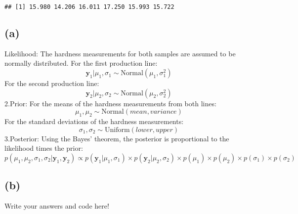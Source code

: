 \documentclass[
]{article}
\begin{document}
\begin{verbatim}
## [1] 15.980 14.206 16.011 17.250 15.993 15.722
\end{verbatim}

\hypertarget{a-2}{%
\subsection{(a)}\label{a-2}}

Likelihood: The hardness measurements for both samples are assumed to be
normally distributed. For the first production line: \[
\mathbf{y}_1 | \mu_1, \sigma_1 \sim \text{Normal}(\mu_1, \sigma_1^2)
\] For the second production line: \[
\mathbf{y}_2 | \mu_2, \sigma_2 \sim \text{Normal}(\mu_2, \sigma_2^2)
\] 2.Prior: For the means of the hardness measurements from both lines:
\[
\mu_1, \mu_2 \sim \text{Normal}(mean,variance)
\] For the standard deviations of the hardness measurements: \[
\sigma_1, \sigma_2 \sim \text{Uniform}(lower, upper)
\] 3.Posterior: Using the Bayes' theorem, the posterior is proportional
to the likelihood times the prior: \[
p(\mu_1, \mu_2, \sigma_1, \sigma_2 | \mathbf{y}_1, \mathbf{y}_2) \propto p(\mathbf{y}_1 | \mu_1, \sigma_1) \times p(\mathbf{y}_2 | \mu_2, \sigma_2) \times p(\mu_1) \times p(\mu_2) \times p(\sigma_1) \times p(\sigma_2)
\]

\hypertarget{b-2}{%
\subsection{(b)}\label{b-2}}

Write your answers and code here!
\end{document}

